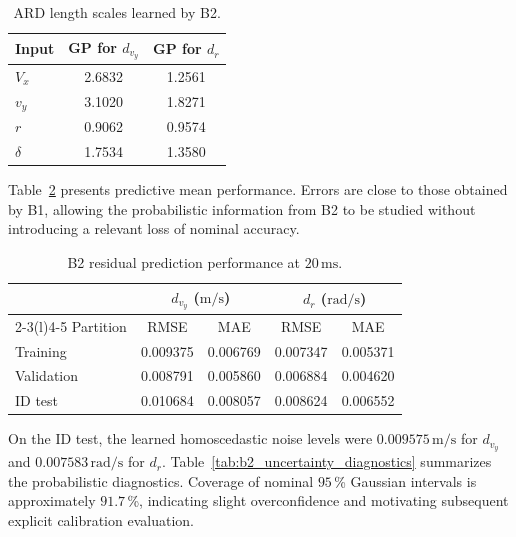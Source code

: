 \documentclass[12pt,a4paper]{report}
\begin{document}
\begin{table}[htbp]
    \centering
    \caption{ARD length scales learned by B2.}
    \label{tab:b2_length_scales}
    \begin{tabular}{@{}lcc@{}}
        \toprule
        Input & GP for $d_{v_y}$ & GP for $d_r$ \\
        \midrule
        $V_x$     & 2.6832 & 1.2561 \\
        $v_y$     & 3.1020 & 1.8271 \\
        $r$       & 0.9062 & 0.9574 \\
        $\delta$  & 1.7534 & 1.3580 \\
        \bottomrule
    \end{tabular}
\end{table}

Table~\ref{tab:b2_residual_performance} presents predictive mean performance. Errors are close to those obtained by B1, allowing the probabilistic information from B2 to be studied without introducing a relevant loss of nominal accuracy.

\begin{table}[htbp]
    \centering
    \caption{B2 residual prediction performance at $20\,\mathrm{ms}$.}
    \label{tab:b2_residual_performance}
    \begin{tabular}{@{}lcccc@{}}
        \toprule
        & \multicolumn{2}{c}{$d_{v_y}$ ($\mathrm{m/s}$)}
        & \multicolumn{2}{c}{$d_r$ ($\mathrm{rad/s}$)} \\
        \cmidrule(lr){2-3}\cmidrule(l){4-5}
        Partition & RMSE & MAE & RMSE & MAE \\
        \midrule
        Training & 0.009375 & 0.006769 & 0.007347 & 0.005371 \\
        Validation     & 0.008791 & 0.005860 & 0.006884 & 0.004620 \\
        ID test      & 0.010684 & 0.008057 & 0.008624 & 0.006552 \\
        \bottomrule
    \end{tabular}
\end{table}

On the ID test, the learned homoscedastic noise levels were $0.009575\,\mathrm{m/s}$ for $d_{v_y}$ and $0.007583\,\mathrm{rad/s}$ for $d_r$. Table~\ref{tab:b2_uncertainty_diagnostics} summarizes the probabilistic diagnostics. Coverage of nominal $95$\,\% Gaussian intervals is approximately $91.7$\,\%, indicating slight overconfidence and motivating subsequent explicit calibration evaluation.
\end{document}
